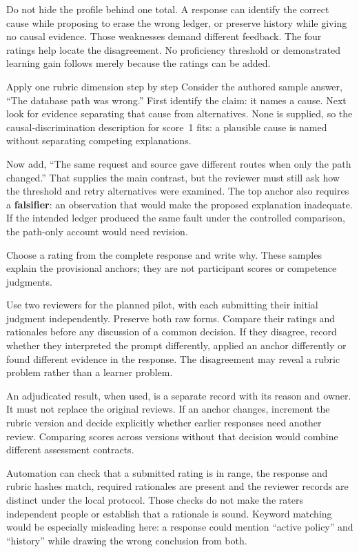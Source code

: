Do not hide the profile behind one total. A response can identify the correct cause while proposing to erase the wrong ledger, or preserve history while giving no causal evidence. Those weaknesses demand different feedback. The four ratings help locate the disagreement. No proficiency threshold or demonstrated learning gain follows merely because the ratings can be added.

\begin{examplebox}{Apply one rubric dimension step by step}
Consider the authored sample answer, ``The database path was wrong.'' First identify the claim: it names a cause. Next look for evidence separating that cause from alternatives. None is supplied, so the causal-discrimination description for score~1 fits: a plausible cause is named without separating competing explanations.

Now add, ``The same request and source gave different routes when only the path changed.'' That supplies the main contrast, but the reviewer must still ask how the threshold and retry alternatives were examined. The top anchor also requires a \textbf{falsifier}: an observation that would make the proposed explanation inadequate. If the intended ledger produced the same fault under the controlled comparison, the path-only account would need revision.

Choose a rating from the complete response and write why. These samples explain the provisional anchors; they are not participant scores or competence judgments.
\end{examplebox}

Use two reviewers for the planned pilot, with each submitting their initial judgment independently. Preserve both raw forms. Compare their ratings and rationales before any discussion of a common decision. If they disagree, record whether they interpreted the prompt differently, applied an anchor differently or found different evidence in the response. The disagreement may reveal a rubric problem rather than a learner problem.

An adjudicated result, when used, is a separate record with its reason and owner. It must not replace the original reviews. If an anchor changes, increment the rubric version and decide explicitly whether earlier responses need another review. Comparing scores across versions without that decision would combine different assessment contracts.

Automation can check that a submitted rating is in range, the response and rubric hashes match, required rationales are present and the reviewer records are distinct under the local protocol. Those checks do not make the raters independent people or establish that a rationale is sound. Keyword matching would be especially misleading here: a response could mention \enquote{active policy} and \enquote{history} while drawing the wrong conclusion from both.

